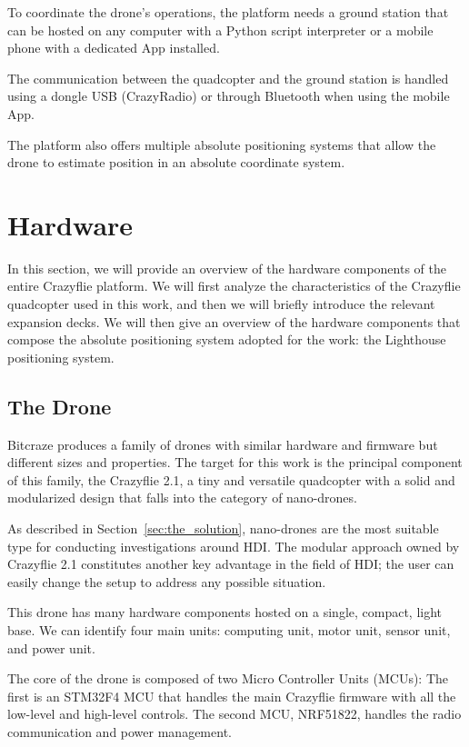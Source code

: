 To coordinate the drone's operations, the platform needs a ground station that can be hosted on any computer 
with a Python script interpreter or a mobile phone with a dedicated App installed. 

The communication between the quadcopter and the ground station is handled using a dongle USB (CrazyRadio) or through Bluetooth when using the mobile App.

The platform also offers multiple absolute positioning systems that allow the drone to estimate position in an absolute coordinate system.

\section{Hardware}\label{sec:crazyflie_hardware}
In this section, we will provide an overview of the hardware components of the entire Crazyflie platform. 
We will first analyze the characteristics of the Crazyflie quadcopter used in this work, and then we will briefly introduce the relevant expansion decks. 
We will then give an overview of the hardware components that compose the absolute positioning system adopted for the work: the Lighthouse positioning system.

\subsection{The Drone}\label{subsec:the_quadcopter}
Bitcraze produces a family of drones with similar hardware and firmware but different sizes and properties. 
The target for this work is the principal component of this family, the Crazyflie 2.1, a tiny and versatile quadcopter with a solid and modularized design that falls into the category of nano-drones.

As described in Section~\ref{sec:the_solution}, nano-drones are the most suitable type for conducting investigations around HDI. 
The modular approach owned by Crazyflie 2.1 constitutes another key advantage in the field of HDI; 
the user can easily change the setup to address any possible situation. 

This drone has many hardware components hosted on a single, compact, light base. 
We can identify four main units: computing unit, motor unit, sensor unit, and power unit.

The core of the drone is composed of two Micro Controller Units (MCUs): 
The first is an STM32F4 MCU that handles the main Crazyflie firmware with all the low-level and high-level controls. 
The second MCU, NRF51822, handles the radio communication and power management. 

